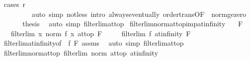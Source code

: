 \begin{isabellebody}
\ {\isacharparenleft}{\kern0pt}cases\ {\isachardoublequoteopen}r\ {\isachargreater}{\kern0pt}\ {}{\isachardoublequoteclose}{\isacharparenright}{\kern0pt}\isanewline
\ \ \ \ \ \ \ \ \ {\isacharparenleft}{\kern0pt}auto\ simp{\isacharcolon}{\kern0pt}\ not{\isacharunderscore}{\kern0pt}less\ intro{\isacharcolon}{\kern0pt}\ always{\isacharunderscore}{\kern0pt}eventually\ order{\isachardot}{\kern0pt}trans{\isacharbrackleft}{\kern0pt}OF\ {\isacharunderscore}{\kern0pt}\ norm{\isacharunderscore}{\kern0pt}ge{\isacharunderscore}{\kern0pt}zero{\isacharbrackright}{\kern0pt}{\isacharparenright}{\kern0pt}\isanewline
\ \ \isacommand{{\isacharbraceright}{\kern0pt}}\isamarkupfalse%
\isanewline
\ \ \isamarkupfalse%
\ {\isacharquery}{\kern0pt}thesis\ \isamarkupfalse%
\ {\isacharparenleft}{\kern0pt}auto\ simp{\isacharcolon}{\kern0pt}\ filterlim{\isacharunderscore}{\kern0pt}at{\isacharunderscore}{\kern0pt}top{\isacharparenright}{\kern0pt}\isanewline
{}\isamarkupfalse%
%
\endisatagproof
{\isafoldproof}%
%
\isadelimproof
\isanewline
%
\endisadelimproof
\isanewline
{}\isamarkupfalse%
\ filterlim{\isacharunderscore}{\kern0pt}norm{\isacharunderscore}{\kern0pt}at{\isacharunderscore}{\kern0pt}top{\isacharunderscore}{\kern0pt}imp{\isacharunderscore}{\kern0pt}at{\isacharunderscore}{\kern0pt}infinity{\isacharcolon}{\kern0pt}\isanewline
\ \ \ F\isanewline
\ \ \ {\isachardoublequoteopen}filterlim\ {\isacharparenleft}{\kern0pt}{\isasymlambda}x{\isachardot}{\kern0pt}\ norm\ {\isacharparenleft}{\kern0pt}f\ x{\isacharparenright}{\kern0pt}{\isacharparenright}{\kern0pt}\ at{\isacharunderscore}{\kern0pt}top\ F{\isachardoublequoteclose}\isanewline
\ \ \ \ \ {\isachardoublequoteopen}filterlim\ f\ at{\isacharunderscore}{\kern0pt}infinity\ F{\isachardoublequoteclose}\isanewline
%
\isadelimproof
\ \ %
\endisadelimproof
%
\isatagproof
{}\isamarkupfalse%
\ filterlim{\isacharunderscore}{\kern0pt}at{\isacharunderscore}{\kern0pt}infinity{\isacharbrackleft}{\kern0pt}of\ {}\ f\ F{\isacharbrackright}{\kern0pt}\ assms\ \isamarkupfalse%
\ {\isacharparenleft}{\kern0pt}auto\ simp{\isacharcolon}{\kern0pt}\ filterlim{\isacharunderscore}{\kern0pt}at{\isacharunderscore}{\kern0pt}top{\isacharparenright}{\kern0pt}%
\endisatagproof
{\isafoldproof}%
%
\isadelimproof
\isanewline
%
\endisadelimproof
\isanewline
{}\isamarkupfalse%
\ filterlim{\isacharunderscore}{\kern0pt}norm{\isacharunderscore}{\kern0pt}at{\isacharunderscore}{\kern0pt}top{\isacharcolon}{\kern0pt}\ {\isachardoublequoteopen}filterlim\ norm\ at{\isacharunderscore}{\kern0pt}top\ at{\isacharunderscore}{\kern0pt}infinity{\isachardoublequoteclose}\isanewline

\end{isabellebody}
